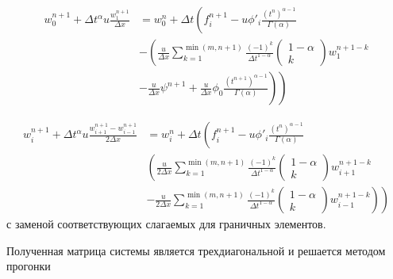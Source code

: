 
\begin{equation}
	\begin{split}
		w_0^{n+1} + \Delta t^{\alpha} u \frac{w_{1}^{n+1}}{\Delta x}
		&= w_0^{n} + \Delta t
		\left(
			f_i^{n+1} - u \phi'_{i}\frac{\left(t^n\right)^{\alpha - 1}}{\Gamma(\alpha)}
		\right.\\
		&\left. -
			\left(
				\frac{u}{\Delta x}
				\sum_{k=1}^{\min (m,n+1)}
				\frac{(-1)^k}{\Delta t^{1-\alpha}} \begin{pmatrix} 1 - \alpha \\ k \end{pmatrix}
				w^{n+1-k}_{1}
			\right.
		\right.\\
		&\left.
			\left.
				- \frac{u}{\Delta x}\psi^{n+1} + \frac{u}{\Delta x}\phi_0
				\frac{\left(t^{n+1}\right)^{\alpha - 1}}{\Gamma(\alpha)}
			\right)
		\right)
	\end{split}
\end{equation}

\begin{equation}
	\begin{split}
		w_i^{n+1} + \Delta t^{\alpha} u \frac{w_{i+1}^{n+1} - w_{i-1}^{n+1}}{2 \Delta x}
		&= w_i^{n} + \Delta t
		\left(
			f_i^{n+1} - u \phi'_{i}\frac{\left(t^n\right)^{\alpha - 1}}{\Gamma(\alpha)}
		\right.\\
		&\left.
			\left(
				\frac{u}{2 \Delta x}
				\sum_{k=1}^{\min (m,n+1)}
				\frac{(-1)^k}{\Delta t^{1-\alpha}}
				\begin{pmatrix} 1 - \alpha \\ k \end{pmatrix}
				w^{n+1-k}_{i+1}
			\right.
		\right.\\
		&\left.
			\left.
				- \frac{u}{2 \Delta x}
				\sum_{k=1}^{\min (m,n+1)}
				\frac{(-1)^k}{\Delta t^{1-\alpha}}
				\begin{pmatrix} 1 - \alpha \\ k \end{pmatrix}
				w^{n+1-k}_{i-1}
			\right)
		\right)
	\end{split}
\end{equation}
с заменой соответствующих слагаемых для граничных элементов.

Полученная матрица системы является трехдиагональной и решается методом прогонки

